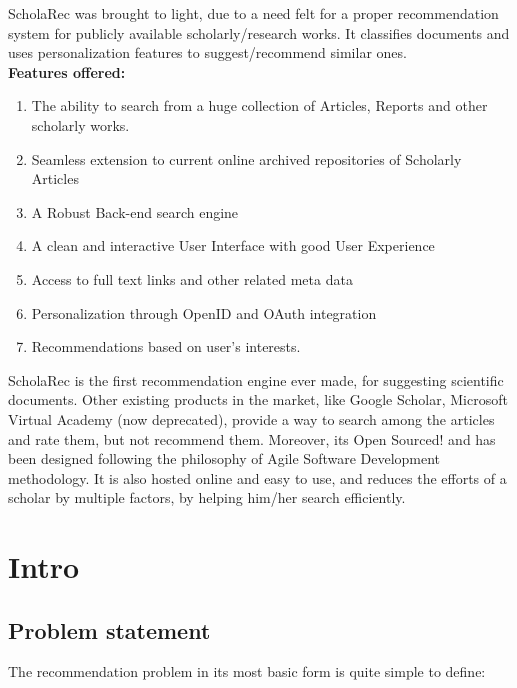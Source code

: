 \documentclass[a4 paper,11pt]{report}
\begin{document}
ScholaRec was brought to light, due to a need felt for a proper recommendation system for publicly available scholarly/research works. It classifies documents and uses personalization features to suggest/recommend similar ones. \\[10pt]

\textbf {Features offered:}
\begin {enumerate}
\item The ability to search from a huge collection of Articles, Reports and other scholarly works.
\item Seamless extension to current online archived repositories of Scholarly Articles
\item A Robust Back-end search engine
\item A clean and interactive User Interface with good User Experience
\item Access to full text links and other related meta data
\item Personalization through OpenID and OAuth integration 
\item Recommendations based on user's interests.\\
\end {enumerate}
ScholaRec is the first recommendation engine ever made, for suggesting scientific documents. Other existing products in the market, like Google Scholar, Microsoft Virtual Academy (now deprecated), provide a way to search among the articles and rate them, but not recommend them. Moreover, its Open Sourced! and has been designed following the philosophy of Agile Software Development methodology. It is also hosted online and easy to use, and reduces the efforts of a scholar by multiple factors, by helping him/her search efficiently.


\setcounter{page}{1}


\chapter {Intro}

\section {Problem statement}

The recommendation problem in its most basic form is quite simple to define:
\end{document}
